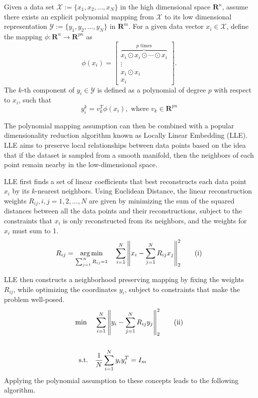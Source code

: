 \documentclass[a0,landscape]{a0poster}
\DeclareMathOperator*{\argmin}{arg\,min} %
\begin{document}
\begin{multicols}{4}
\par Given a data set $\mathcal{X}:=\{x_1, x_2, ..., x_N\}$ in the high dimensional space $\mathbf{R} ^n$, assume there exists an explicit polynomial mapping from $\mathcal{X}$ to its low dimensional representation $\mathcal{Y}:=\{y_1, y_2, ..., y_N\}$ in $\mathbf{R}^m$. 
For a given data vector $x_i \in \mathcal{X}$, define the mapping $\phi:\mathbf{R}^n\rightarrow\mathbf{R}^{pn}$ as
\[\phi(x_i) =
\begin{bmatrix}
\overbrace{x_i \odot x_i \odot \cdots \odot x_i}^{p \text{ times}} \\
\vdots \\
x_i \odot x_i \\
x_i
\end{bmatrix}.\]
The $k$-th component of $y_i \in \mathcal{Y}$ is defined as a polynomial of degree $p$ with respect to $x_i$, such that
\[y_i^k = v_k^T\phi(x_i), \text{ where } v_k \in \mathbf{R}^{pn}\] 
\par The polynomial mapping assumption can then be combined with a popular dimensionality reduction algorithm known as Locally Linear Embedding (LLE). LLE aims to preserve local relationships between data points based on the idea that if the dataset is sampled from a smooth manifold, then the neighbors of each point remain nearby in the low-dimensional space. 
\par LLE first finds a set of linear coefficients that best reconstructs each data point $x_i$ by its $k$-nearest neighbors. Using Euclidean Distance, the linear reconstruction weights $R_{ij}, i,j=1,2,...,N$ are given by minimizing the sum of the squared distances between all the data points and their reconstructions, subject to the constraints that $x_i$ is only reconstructed from its neighbors, and the weights for $x_i$ must sum to 1. 
\[R_{ij} = \argmin_{\sum_{j=1}^N{R_{ij}}=1}\quad\sum_{i=1}^N{\norm{x_i - \sum_{j=1}^N{R_{ij}x_j}}}_{2}^2 \tag{i}\]
\par LLE then constructs a neighborhood preserving mapping by fixing the weights $R_{ij}$, while optimizing the coordinates $y_i$, subject to constraints that make the problem well-posed.
\begin{align*}
    \min{} \quad &\sum_{i=1}^N{\norm{y_i-\sum_{j=1}^N{R_{ij}y_j}}_2^2} \tag{ii}\\
    \\
    \text{s.t.} \quad &\frac{1}{N}\sum_{i=1}^N{y_iy_i^T=I_m}
\end{align*}
Applying the polynomial assumption to these concepts leads to the following algorithm.


\end{multicols}
\end{document}
